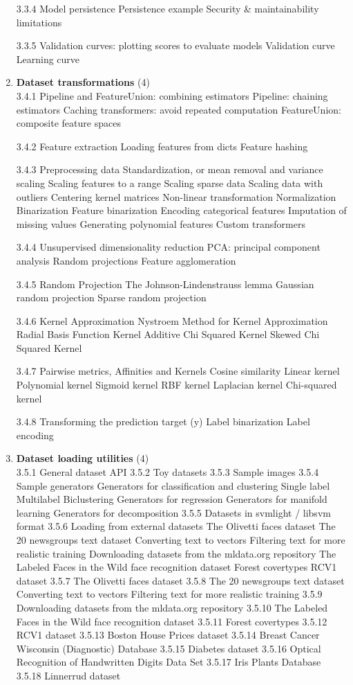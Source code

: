 \documentclass{article}
\begin{document}
\begin{enumerate}
3.3.4 Model persistence
Persistence example
Security & maintainability limitations

3.3.5 Validation curves: plotting scores to evaluate models
Validation curve
Learning curve


\item \textbf{Dataset transformations} (4)\\
3.4.1 Pipeline and FeatureUnion: combining estimators
Pipeline: chaining estimators
Caching transformers: avoid repeated computation
FeatureUnion: composite feature spaces

3.4.2 Feature extraction
Loading features from dicts
Feature hashing

3.4.3 Preprocessing data
Standardization, or mean removal and variance scaling
Scaling features to a range
Scaling sparse data
Scaling data with outliers
Centering kernel matrices
Non-linear transformation
Normalization
Binarization
Feature binarization
Encoding categorical features
Imputation of missing values
Generating polynomial features
Custom transformers

3.4.4 Unsupervised dimensionality reduction
PCA: principal component analysis
Random projections
Feature agglomeration

3.4.5 Random Projection
The Johnson-Lindenstrauss lemma
Gaussian random projection
Sparse random projection

3.4.6 Kernel Approximation
Nystroem Method for Kernel Approximation
Radial Basis Function Kernel
Additive Chi Squared Kernel
Skewed Chi Squared Kernel


3.4.7 Pairwise metrics, Affinities and Kernels
Cosine similarity
Linear kernel
Polynomial kernel
Sigmoid kernel
RBF kernel
Laplacian kernel
Chi-squared kernel

3.4.8 Transforming the prediction target (y)
Label binarization
Label encoding


\item \textbf{Dataset loading utilities} (4)\\
3.5.1 General dataset API
3.5.2 Toy datasets
3.5.3 Sample images
3.5.4 Sample generators
Generators for classification and clustering
Single label
Multilabel
Biclustering
Generators for regression
Generators for manifold learning
Generators for decomposition
3.5.5 Datasets in svmlight / libsvm format
3.5.6 Loading from external datasets
The Olivetti faces dataset
The 20 newsgroups text dataset
Converting text to vectors
Filtering text for more realistic training
Downloading datasets from the mldata.org repository
The Labeled Faces in the Wild face recognition dataset
Forest covertypes
RCV1 dataset
3.5.7 The Olivetti faces dataset
3.5.8 The 20 newsgroups text dataset
Converting text to vectors
Filtering text for more realistic training
3.5.9 Downloading datasets from the mldata.org repository
3.5.10 The Labeled Faces in the Wild face recognition dataset
3.5.11 Forest covertypes
3.5.12 RCV1 dataset
3.5.13 Boston House Prices dataset
3.5.14 Breast Cancer Wisconsin (Diagnostic) Database
3.5.15 Diabetes dataset
3.5.16 Optical Recognition of Handwritten Digits Data Set
3.5.17 Iris Plants Database
3.5.18 Linnerrud dataset


\end{enumerate}
\end{document}
